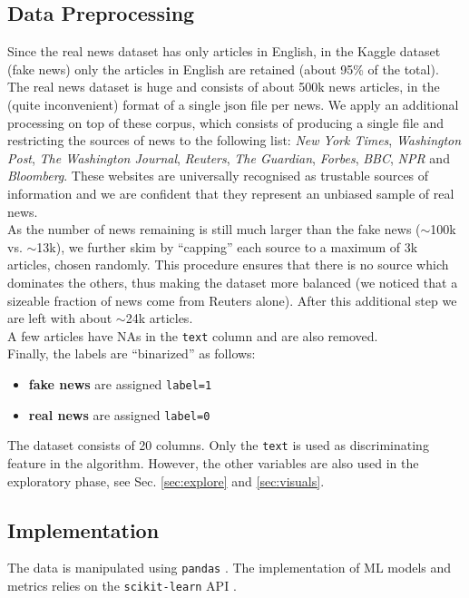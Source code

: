 \documentclass[a4paper,12pt]{article} %
\begin{document}
\subsection{Data Preprocessing}
\label{sec:preproc}
Since the real news dataset has only articles in English,
in the Kaggle dataset (fake news) only the articles
in English are retained (about 95\% of the total). \\
The real news dataset is huge and consists of about 500k news articles, in the
(quite inconvenient) format of a single json file per news.
We apply an additional processing on top of these corpus, which
consists of producing a single file and restricting the sources of news
to the following list: \textit{New York Times}, \textit{Washington Post},
\textit{The Washington Journal},
\textit{Reuters}, \textit{The Guardian}, \textit{Forbes},
\textit{BBC}, \textit{NPR} and \textit{Bloomberg}.
These websites are universally recognised as trustable sources of
information and we are confident that they represent an unbiased
sample of real news. \\
As the number of news remaining is still much larger
than the fake news ($\sim$100k vs. $\sim$13k), we further skim
by ``capping'' each source to a maximum of 3k articles,
chosen randomly. This procedure ensures that there is no source which
dominates the others, thus making the dataset more balanced (we
noticed that a sizeable fraction of news come from Reuters alone).
After this additional step we are left with about $\sim$24k articles.\\
A few articles have NAs in the \texttt{text} column and are also removed. \\
Finally, the labels are ``binarized'' as follows:
\begin{itemize}
\item \textbf{fake news} are assigned \texttt{label=1}
\item \textbf{real news} are assigned \texttt{label=0}
\end{itemize}

The dataset consists of 20 columns.
Only the \texttt{text} is used as discriminating feature in the
algorithm. However, the other variables are also used in the exploratory phase,
see Sec. \ref{sec:explore} and \ref{sec:visuals}.



\subsection{Implementation}
\label{sec:implementation}
The data is manipulated using \texttt{pandas} \cite{mckinney-proc-scipy-2010}.
The implementation of ML models and metrics relies on the \texttt{scikit-learn} API \cite{scikit-learn}.
\end{document}

